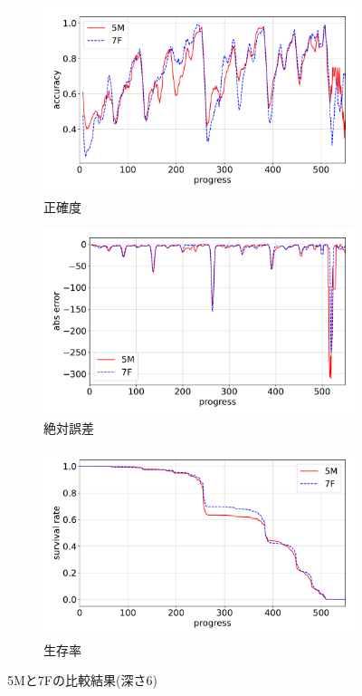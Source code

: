 \begin{figure}[t]
\centering
\begin{subfigure}[b]{0.8\linewidth}
    \includegraphics[width=\linewidth]{pdf/compare/EXP6_NT5M_and_NT7F/accuracy.pdf}
    \caption{正確度}
    \label{fig:EXP6_NT5M_and_NT7F_accuracy}
\end{subfigure}
\begin{subfigure}[b]{0.8\linewidth}
    \includegraphics[width=\linewidth]{pdf/compare/EXP6_NT5M_and_NT7F/error_abs.pdf}
    \caption{絶対誤差}
    \label{fig:EXP6_NT5M_and_NT7F_error_abs}
\end{subfigure}
\begin{subfigure}[b]{0.8\linewidth}
    \includegraphics[width=\linewidth]{pdf/compare/EXP6_NT5M_and_NT7F/survival.pdf}
    \caption{生存率}
    \label{fig:EXP6_NT5M_and_NT7F_survival}
\end{subfigure}
\caption{5Mと7Fの比較結果(深さ6)}
\label{fig:EXP6_NT5M_and_NT7F_results}
\end{figure}

